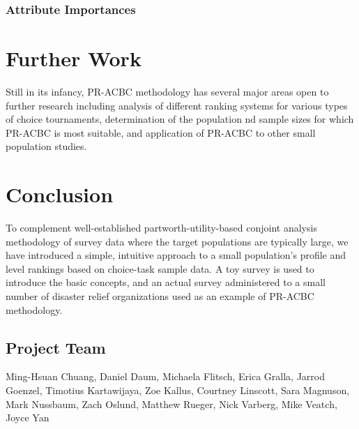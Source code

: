 \documentclass[a4paper, 12pt]{article}
\begin{document}
\subsubsection{Attribute Importances}

\section{Further Work}
Still in its infancy, PR-ACBC methodology has several major areas open to further research including analysis of  different ranking systems for various types of choice tournaments, determination of the population nd sample sizes for which PR-ACBC is most suitable, and application of PR-ACBC to other small population studies.



\section{Conclusion}
To complement well-established partworth-utility-based conjoint analysis methodology of survey data where the target populations are typically large, we have introduced a simple, intuitive approach to a small population's profile and level rankings based on choice-task sample data. A toy survey is used to introduce the basic concepts, and an actual survey administered to a small number of disaster relief organizations used as an example of PR-ACBC methodology. 






\subsection*{Project Team}

Ming-Hsuan Chuang,
Daniel Daum, Michaela Flitsch, Erica Gralla, Jarrod Goenzel, Timotius Kartawijaya, Zoe Kallus, Courtney Linscott, Sara Magnuson, Mark Nussbaum, Zach Oslund, Matthew Rueger, Nick Varberg, Mike Veatch, Joyce Yan   
\end{document}
